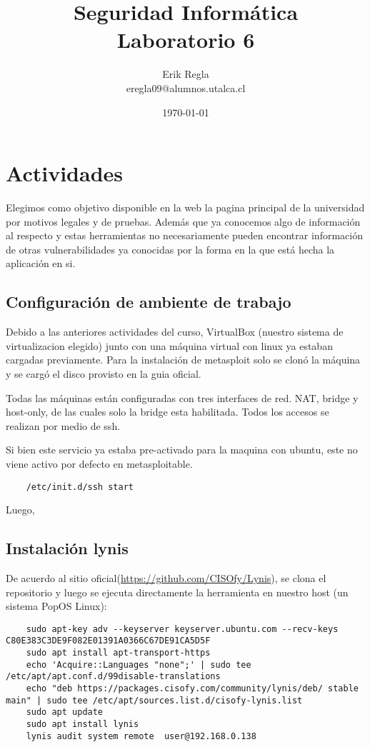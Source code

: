 \documentclass[11pt]{utalcaDoc}
\title{{\bf Seguridad Informática}\\ Laboratorio 6}
\author{Erik Regla\\ eregla09@alumnos.utalca.cl}
\date{\today}
\begin{document}
\maketitle
\newpage
\tableofcontents
\newpage

\section{Actividades}

Elegimos como objetivo disponible en la web la pagina principal de la universidad por motivos legales y de pruebas. Además que ya conocemos algo de información al respecto y estas herramientas no necesariamente pueden encontrar información de otras vulnerabilidades ya conocidas por la forma en la que está hecha la aplicación en si.


\subsection{Configuración de ambiente de trabajo}
Debido a las anteriores actividades del curso, VirtualBox (nuestro sistema de virtualizacion elegido) junto con una máquina virtual con linux ya estaban cargadas previamente. Para la instalación de metasploit solo se clonó la máquina y se cargó el disco provisto en la guia oficial.

Todas las máquinas están configuradas con tres interfaces de red. NAT, bridge y host-only, de las cuales solo la bridge esta habilitada. Todos los accesos se realizan por medio de ssh.

Si bien este servicio ya estaba pre-activado para la maquina con ubuntu, este no viene activo por defecto en metasploitable.

\begin{verbatim}
	/etc/init.d/ssh start
\end{verbatim}

Luego, 


\subsection{Instalación lynis}
De acuerdo al sitio oficial(\url{https://github.com/CISOfy/Lynis}), se clona el repositorio y luego se ejecuta directamente la herramienta en nuestro host (un sistema PopOS Linux):

\begin{verbatim}
	sudo apt-key adv --keyserver keyserver.ubuntu.com --recv-keys C80E383C3DE9F082E01391A0366C67DE91CA5D5F
	sudo apt install apt-transport-https
	echo 'Acquire::Languages "none";' | sudo tee /etc/apt/apt.conf.d/99disable-translations
	echo "deb https://packages.cisofy.com/community/lynis/deb/ stable main" | sudo tee /etc/apt/sources.list.d/cisofy-lynis.list
	sudo apt update
	sudo apt install lynis
	lynis audit system remote  user@192.168.0.138
\end{verbatim}
\end{document}
